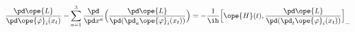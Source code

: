 \begin{equation}	\label{12.81new}
\frac{\pd\ope{L}}{\pd \ope{\varphi}_i(x_t)}
-
\sum_{a=1}^{3}\frac{\pd}{\pd x^a}\Bigl(
		\frac{\pd\ope{L}}{\pd(\pd_a\ope{\varphi}_i(x_t) )}
		 \Bigr)
=
- \frac{1}{\ih}
\Bigl[
\ope{H}(t) ,
\frac{\pd\ope{L}}{\pd(\pd_t\ope{\varphi}_i(x_t) )} %
\Bigr]_{\_}
	\end{equation}

